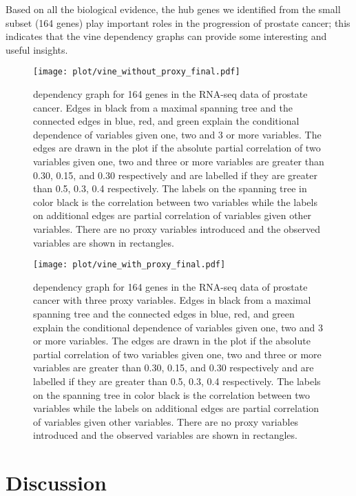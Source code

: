 \documentclass[a4paper]{article}
\begin{document}
Based on all the biological evidence, the hub genes we identified from
the small subset (164 genes) play important roles in the progression
of prostate cancer; this indicates that the vine dependency graphs can
provide some interesting and useful insights.

\begin{figure}[!ht]
\centering
\texttt{[image: plot/vine\_without\_proxy\_final.pdf]}
\caption{\footnotesize{dependency graph for 164 genes in the RNA-seq data of prostate cancer. 
Edges in black from a maximal spanning tree and the connected edges in blue, red, and green explain the conditional dependence of variables given one, two and 3 or more variables. 
The edges are drawn in the plot if the absolute partial correlation of two variables given one, two and three or more variables are greater than 0.30, 0.15, and 0.30 respectively and are labelled if they are greater than 0.5, 0.3, 0.4 respectively. The labels on the spanning tree in color black is the correlation between two variables while the labels on additional edges are partial correlation of variables given other variables. 
There are no proxy variables introduced and the observed variables are shown in rectangles.}}
\label{fig-vine-without-proxy}
\end{figure}


\begin{figure}[!ht]
\centering
\texttt{[image: plot/vine\_with\_proxy\_final.pdf]}
\caption{\footnotesize{dependency graph for 164 genes in the RNA-seq data of prostate cancer with three proxy variables. 
Edges in black from a maximal spanning tree and the connected edges in blue, red, and green explain the conditional dependence of variables given one, two and 3 or more variables. 
The edges are drawn in the plot if the absolute partial correlation of two variables given one, two and three or more variables are greater than 0.30, 0.15, and 0.30 respectively and are labelled if they are greater than 0.5, 0.3, 0.4 respectively. The labels on the spanning tree in color black is the correlation between two variables while the labels on additional edges are partial correlation of variables given other variables. 
There are no proxy variables introduced and the observed variables are shown in rectangles.}}
\label{fig-vine-with-proxy}
\end{figure}

\section{Discussion}
\label{sec-discussion}
\end{document}
